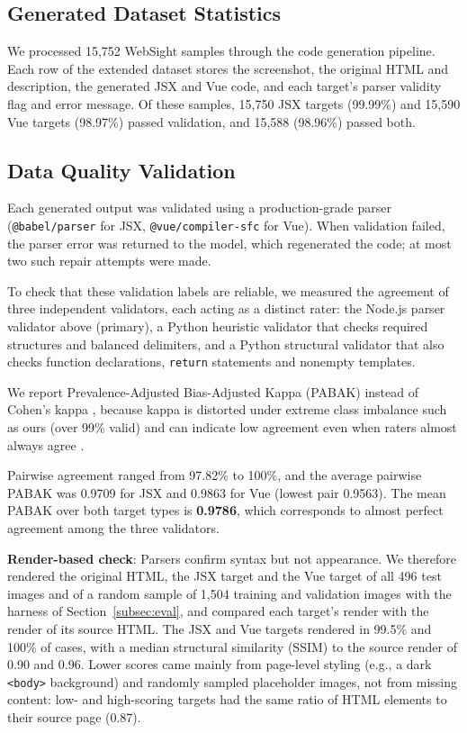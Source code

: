 \documentclass[conference,a4paper]{IEEEtran}
\begin{document}
\subsection{Generated Dataset Statistics}
\label{subsec:generated-stats}

We processed 15,752 WebSight samples through the code generation pipeline. Each row of the extended dataset stores the screenshot, the original HTML and description, the generated JSX and Vue code, and each target's parser validity flag and error message. Of these samples, 15,750 JSX targets (99.99\%) and 15,590 Vue targets (98.97\%) passed validation, and 15,588 (98.96\%) passed both.

\subsection{Data Quality Validation}
\label{subsec:data-quality-validation}

Each generated output was validated using a production-grade parser (\texttt{@babel/parser} for JSX, \texttt{@vue/compiler-sfc} for Vue). When validation failed, the parser error was returned to the model, which regenerated the code; at most two such repair attempts were made.

To check that these validation labels are reliable, we measured the agreement of three independent validators, each acting as a distinct rater: the Node.js parser validator above (primary), a Python heuristic validator that checks required structures and balanced delimiters, and a Python structural validator that also checks function declarations, \texttt{return} statements and nonempty templates.

We report Prevalence-Adjusted Bias-Adjusted Kappa (PABAK) \cite{byrt1993bias} instead of Cohen's kappa \cite{cohen1960coefficient}, because kappa is distorted under extreme class imbalance such as ours (over 99\% valid) and can indicate low agreement even when raters almost always agree \cite{feinstein1990high}.

Pairwise agreement ranged from 97.82\% to 100\%, and the average pairwise PABAK was 0.9709 for JSX and 0.9863 for Vue (lowest pair 0.9563). The mean PABAK over both target types is \textbf{0.9786}, which corresponds to almost perfect agreement \cite{landis1977measurement} among the three validators.

\textbf{Render-based check}: Parsers confirm syntax but not appearance. We therefore rendered the original HTML, the JSX target and the Vue target of all 496 test images and of a random sample of 1,504 training and validation images with the harness of Section~\ref{subsec:eval}, and compared each target's render with the render of its source HTML. The JSX and Vue targets rendered in 99.5\% and 100\% of cases, with a median structural similarity (SSIM) to the source render of 0.90 and 0.96. Lower scores came mainly from page-level styling (e.g., a dark \texttt{<body>} background) and randomly sampled placeholder images, not from missing content: low- and high-scoring targets had the same ratio of HTML elements to their source page (0.87).
\end{document}
